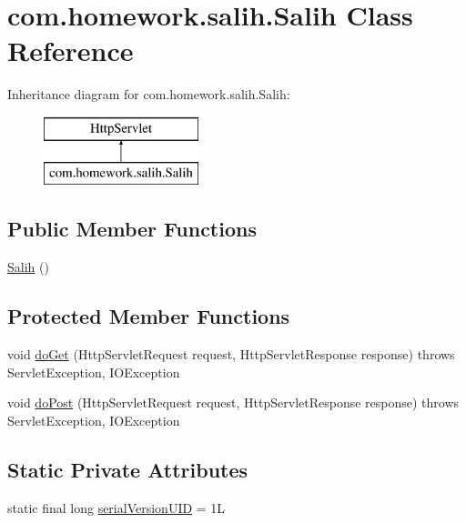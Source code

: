 \hypertarget{classcom_1_1homework_1_1salih_1_1_salih}{}\section{com.\+homework.\+salih.\+Salih Class Reference}
\label{classcom_1_1homework_1_1salih_1_1_salih}
Inheritance diagram for com.\+homework.\+salih.\+Salih\+:\begin{figure}[H]
\begin{center}
\leavevmode
\includegraphics[height=2.000000cm]{classcom_1_1homework_1_1salih_1_1_salih}
\end{center}
\end{figure}
\subsection*{Public Member Functions}
\begin{DoxyCompactItemize}
\item 
\hyperlink{classcom_1_1homework_1_1salih_1_1_salih_a5a5cf5ea6350c6e886b31b07cab5a1ed}{Salih} ()
\end{DoxyCompactItemize}
\subsection*{Protected Member Functions}
\begin{DoxyCompactItemize}
\item 
void \hyperlink{classcom_1_1homework_1_1salih_1_1_salih_ae1a91aa8ab82a6be558a0f677af54ca5}{do\+Get} (Http\+Servlet\+Request request, Http\+Servlet\+Response response)  throws Servlet\+Exception, I\+O\+Exception 
\item 
void \hyperlink{classcom_1_1homework_1_1salih_1_1_salih_a12876a5d48986f78bf4f4f43a2c8bc07}{do\+Post} (Http\+Servlet\+Request request, Http\+Servlet\+Response response)  throws Servlet\+Exception, I\+O\+Exception 
\end{DoxyCompactItemize}
\subsection*{Static Private Attributes}
\begin{DoxyCompactItemize}
\item 
static final long \hyperlink{classcom_1_1homework_1_1salih_1_1_salih_a06003a300306fccbe0a10e15ee6fb247}{serial\+Version\+U\+ID} = 1L
\end{DoxyCompactItemize}


